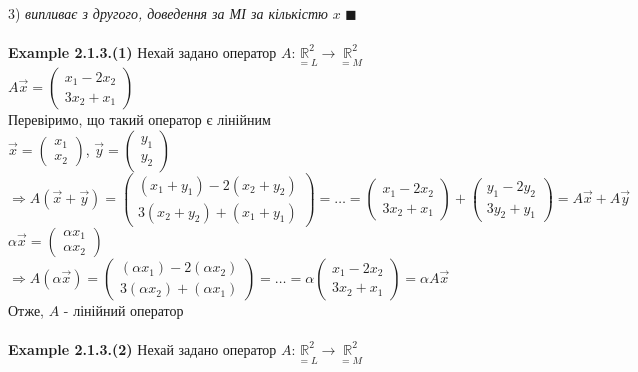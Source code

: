 \documentclass[a4paper, 14pt]{extarticle}
\def\huge{\displaystyle}
\def\ex#1{\textbf{Example {#1}}}
\def\qed{$\blacksquare$}
\begin{document}
	\\
	3) \textit{випливає з другого, доведення за МІ за кількістю} $x$ \qed
	\\
	\\
	\ex{2.1.3.(1)} Нехай задано оператор $A: \underset{=L}{\mathbb{R}^2} \to \underset{=M}{\mathbb{R}^2}$\\
	$\huge A\vec{x} = \begin{pmatrix} x_1 - 2x_2 \\ 3x_2 + x_1 \end{pmatrix}$\\
	Перевіримо, що такий оператор є лінійним\\
	$\huge \vec{x} = \begin{pmatrix} x_1 \\ x_2 \end{pmatrix}$, $\huge \vec{y} = \begin{pmatrix} y_1 \\ y_2 \end{pmatrix}$\\
	$\Rightarrow A(\vec{x} + \vec{y}) = \begin{pmatrix} (x_1+y_1)-2(x_2+y_2) \\ 3(x_2+y_2)+(x_1+y_1) \end{pmatrix} = \dots = \begin{pmatrix} x_1 - 2x_2 \\ 3x_2 + x_1 \end{pmatrix} + \begin{pmatrix} y_1 - 2y_2 \\ 3y_2 + y_1 \end{pmatrix} = A\vec{x} + A\vec{y}$\\
	$\alpha \vec{x} = \begin{pmatrix} \alpha x_1 \\ \alpha x_2 \end{pmatrix}$\\
	$\Rightarrow A(\alpha \vec{x}) = \begin{pmatrix} (\alpha x_1) - 2(\alpha x_2) \\ 3(\alpha x_2) + (\alpha x_1) \end{pmatrix} = \dots = \alpha \begin{pmatrix} x_1 - 2x_2 \\ 3x_2 + x_1 \end{pmatrix} = \alpha A\vec{x}$\\
	Отже, $A$ - лінійний оператор\\
	\\
	\ex{2.1.3.(2)} Нехай задано оператор $A: \underset{=L}{\mathbb{R}^2} \to \underset{=M}{\mathbb{R}^2}$\\
\end{document}
